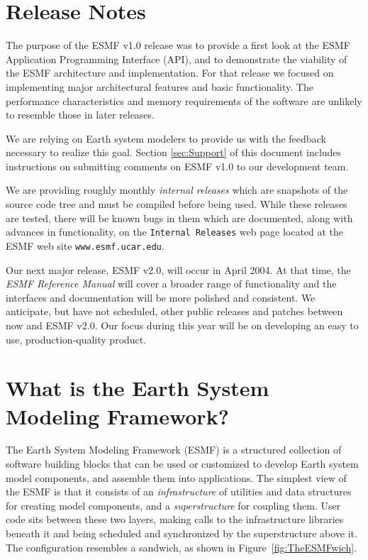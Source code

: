 
\section{Release Notes}

The purpose of the ESMF v1.0 release was to provide a first look at the ESMF
Application Programming Interface (API), and to demonstrate the viability
of the ESMF architecture and implementation.  For that release we focused      
on implementing major architectural features and basic functionality.  The
performance characteristics and memory requirements of the software        
are unlikely to resemble those in later releases.

We are relying on Earth system modelers to provide us with the feedback         
necessary to realize this goal.  Section \ref{sec:Support} of this document     
includes instructions on submitting comments on ESMF v1.0 to our 
development team.

We are providing roughly monthly {\it internal releases} which are snapshots
of the source code tree and must be compiled before being used.  While these
releases are tested, there will be known bugs in them which are documented,
along with advances in functionality, on the {\tt Internal Releases} web page
located at the ESMF web site {\tt www.esmf.ucar.edu}.    

Our next major release, ESMF v2.0, will occur in April 2004.  At that time,
the {\it ESMF Reference Manual} will cover a broader range of functionality
and the interfaces and documentation will be more polished and consistent.
We anticipate, but have
not scheduled, other public releases and patches between now and ESMF v2.0.
Our focus during this year will be on developing an easy to use,
production-quality product.


\section{What is the Earth System Modeling Framework?}

The Earth System Modeling Framework (ESMF) is a structured collection of 
software building blocks that can be used or customized to develop 
Earth system model components, and assemble them into applications.  
The simplest view of the ESMF is that it consists of an {\it infrastructure} 
of utilities and data structures for creating 
model components, and a {\it superstructure} for coupling them.  
User code sits between these two layers, making calls to the infrastructure
libraries beneath it and being scheduled and synchronized by the 
superstructure above it.  The configuration resembles a sandwich, as
shown in Figure~\ref{fig:TheESMFwich}.

